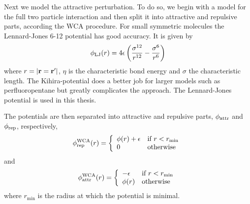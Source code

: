 
Next we model the attractive perturbation. 
To do so, we begin with a model for the full two particle interaction 
and then split it into attractive and repulsive parts, according the WCA procedure.
For small symmetric molecules the Lennard-Jones 6-12 potential has good accuracy.
It is given by
\begin{align}
  \phi_{\textrm{LJ}}(r) = 4\epsilon\left( \frac{\sigma^{12}}{r^{12}} - \frac{\sigma^{6}}{r^{6}} \right)
  \label{eqn:nuc:LJ}
\end{align}
where $r = \left| \textbf{r}=\textbf{r}^\prime \right|$, $\eta$ is the characteristic bond energy 
and $\sigma$ the characteristic length.
The Kihira-potential does a better job for larger models such as perfluoropentane 
but greatly complicates the approach.
The Lennard-Jones potential is used  in this thesis.


The potentials are then separated into attractive and repulsive parts, $\phi_{\text{attr}}$ and $\phi_{\text{rep}}$, respectively,
\begin{align}
  \phi_{\text{rep}}^{\text{WCA}}(r) = \left\{
    \begin{array}{ll}
      \phi(r) +  \epsilon & \text{if $r<r_{\textrm{min}}$}\\
      0 & \text{otherwise}
    \end{array} \right. 
\end{align}
and 
\begin{align}
  \phi_{\text{attr}}^{\text{WCA}}(r) = \left\{ 
    \begin{array}{ll}
      - \epsilon & \text{if $r<r_{\textrm{min}}$}\\
      \phi(r) & \text{otherwise}
    \end{array} \right.
\end{align}
where $r_\min$ is the radius at which the potential is minimal.

